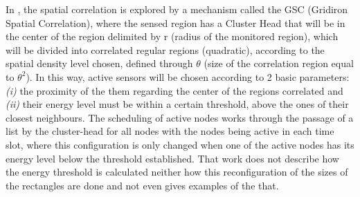 \documentclass[conference]{IEEEtran}
\begin{document}
In \cite{Shah2007}, the spatial correlation is explored by a mechanism called
the GSC (Gridiron Spatial Correlation), where the sensed region has a Cluster
Head that will be in the center of the region delimited by r (radius of the
monitored region), which will be divided into correlated regular regions
(quadratic), according to the spatial density level chosen, defined through
$\theta$ (size of the correlation region equal to $\theta^2$). In this way,
active sensors will be chosen according to 2 basic parameters: {\it (i)} the
proximity of the them regarding the center of the regions correlated and {\it
(ii)} their energy level must be within a certain threshold, above the ones of
their closest neighbours. The scheduling of active nodes works through the
passage of a list by the cluster-head for all nodes 
with the nodes being active in each time slot, where this configuration is only
changed when one of the active nodes has its energy level below the threshold
established.
That work does not describe how the energy threshold is calculated neither how
this reconfiguration of the sizes of the rectangles are done and not even gives
examples of the that.

\end{document}
